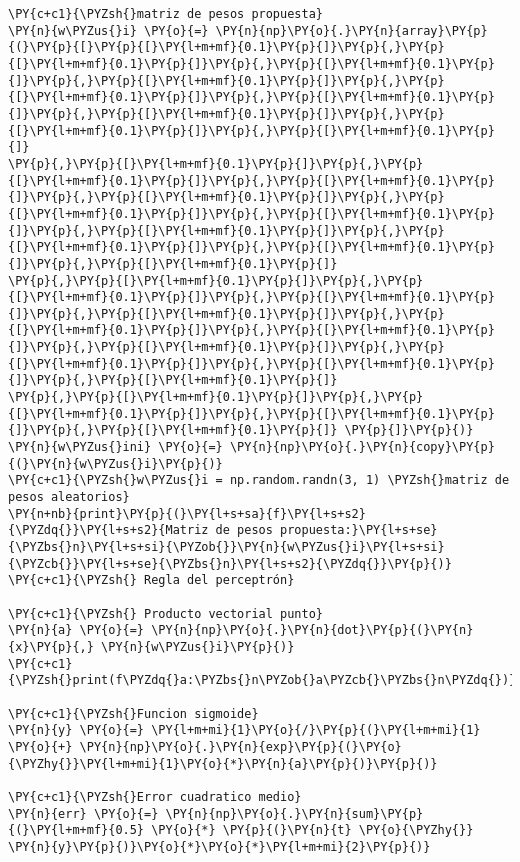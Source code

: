 \begin{tcolorbox}[breakable, size=fbox, boxrule=1pt, pad at break*=1mm,colback=cellbackground, colframe=cellborder]
\begin{Verbatim}[commandchars=\\\{\}]
\PY{c+c1}{\PYZsh{}matriz de pesos propuesta}
\PY{n}{w\PYZus{}i} \PY{o}{=} \PY{n}{np}\PY{o}{.}\PY{n}{array}\PY{p}{(}\PY{p}{[}\PY{p}{[}\PY{l+m+mf}{0.1}\PY{p}{]}\PY{p}{,}\PY{p}{[}\PY{l+m+mf}{0.1}\PY{p}{]}\PY{p}{,}\PY{p}{[}\PY{l+m+mf}{0.1}\PY{p}{]}\PY{p}{,}\PY{p}{[}\PY{l+m+mf}{0.1}\PY{p}{]}\PY{p}{,}\PY{p}{[}\PY{l+m+mf}{0.1}\PY{p}{]}\PY{p}{,}\PY{p}{[}\PY{l+m+mf}{0.1}\PY{p}{]}\PY{p}{,}\PY{p}{[}\PY{l+m+mf}{0.1}\PY{p}{]}\PY{p}{,}\PY{p}{[}\PY{l+m+mf}{0.1}\PY{p}{]}\PY{p}{,}\PY{p}{[}\PY{l+m+mf}{0.1}\PY{p}{]}
\PY{p}{,}\PY{p}{[}\PY{l+m+mf}{0.1}\PY{p}{]}\PY{p}{,}\PY{p}{[}\PY{l+m+mf}{0.1}\PY{p}{]}\PY{p}{,}\PY{p}{[}\PY{l+m+mf}{0.1}\PY{p}{]}\PY{p}{,}\PY{p}{[}\PY{l+m+mf}{0.1}\PY{p}{]}\PY{p}{,}\PY{p}{[}\PY{l+m+mf}{0.1}\PY{p}{]}\PY{p}{,}\PY{p}{[}\PY{l+m+mf}{0.1}\PY{p}{]}\PY{p}{,}\PY{p}{[}\PY{l+m+mf}{0.1}\PY{p}{]}\PY{p}{,}\PY{p}{[}\PY{l+m+mf}{0.1}\PY{p}{]}\PY{p}{,}\PY{p}{[}\PY{l+m+mf}{0.1}\PY{p}{]}\PY{p}{,}\PY{p}{[}\PY{l+m+mf}{0.1}\PY{p}{]}
\PY{p}{,}\PY{p}{[}\PY{l+m+mf}{0.1}\PY{p}{]}\PY{p}{,}\PY{p}{[}\PY{l+m+mf}{0.1}\PY{p}{]}\PY{p}{,}\PY{p}{[}\PY{l+m+mf}{0.1}\PY{p}{]}\PY{p}{,}\PY{p}{[}\PY{l+m+mf}{0.1}\PY{p}{]}\PY{p}{,}\PY{p}{[}\PY{l+m+mf}{0.1}\PY{p}{]}\PY{p}{,}\PY{p}{[}\PY{l+m+mf}{0.1}\PY{p}{]}\PY{p}{,}\PY{p}{[}\PY{l+m+mf}{0.1}\PY{p}{]}\PY{p}{,}\PY{p}{[}\PY{l+m+mf}{0.1}\PY{p}{]}\PY{p}{,}\PY{p}{[}\PY{l+m+mf}{0.1}\PY{p}{]}\PY{p}{,}\PY{p}{[}\PY{l+m+mf}{0.1}\PY{p}{]}
\PY{p}{,}\PY{p}{[}\PY{l+m+mf}{0.1}\PY{p}{]}\PY{p}{,}\PY{p}{[}\PY{l+m+mf}{0.1}\PY{p}{]}\PY{p}{,}\PY{p}{[}\PY{l+m+mf}{0.1}\PY{p}{]}\PY{p}{,}\PY{p}{[}\PY{l+m+mf}{0.1}\PY{p}{]} \PY{p}{]}\PY{p}{)}
\PY{n}{w\PYZus{}ini} \PY{o}{=} \PY{n}{np}\PY{o}{.}\PY{n}{copy}\PY{p}{(}\PY{n}{w\PYZus{}i}\PY{p}{)}
\PY{c+c1}{\PYZsh{}w\PYZus{}i = np.random.randn(3, 1) \PYZsh{}matriz de pesos aleatorios}
\PY{n+nb}{print}\PY{p}{(}\PY{l+s+sa}{f}\PY{l+s+s2}{\PYZdq{}}\PY{l+s+s2}{Matriz de pesos propuesta:}\PY{l+s+se}{\PYZbs{}n}\PY{l+s+si}{\PYZob{}}\PY{n}{w\PYZus{}i}\PY{l+s+si}{\PYZcb{}}\PY{l+s+se}{\PYZbs{}n}\PY{l+s+s2}{\PYZdq{}}\PY{p}{)}
\PY{c+c1}{\PYZsh{} Regla del perceptrón}

\PY{c+c1}{\PYZsh{} Producto vectorial punto}
\PY{n}{a} \PY{o}{=} \PY{n}{np}\PY{o}{.}\PY{n}{dot}\PY{p}{(}\PY{n}{x}\PY{p}{,} \PY{n}{w\PYZus{}i}\PY{p}{)}
\PY{c+c1}{\PYZsh{}print(f\PYZdq{}a:\PYZbs{}n\PYZob{}a\PYZcb{}\PYZbs{}n\PYZdq{})}

\PY{c+c1}{\PYZsh{}Funcion sigmoide}
\PY{n}{y} \PY{o}{=} \PY{l+m+mi}{1}\PY{o}{/}\PY{p}{(}\PY{l+m+mi}{1} \PY{o}{+} \PY{n}{np}\PY{o}{.}\PY{n}{exp}\PY{p}{(}\PY{o}{\PYZhy{}}\PY{l+m+mi}{1}\PY{o}{*}\PY{n}{a}\PY{p}{)}\PY{p}{)}

\PY{c+c1}{\PYZsh{}Error cuadratico medio}
\PY{n}{err} \PY{o}{=} \PY{n}{np}\PY{o}{.}\PY{n}{sum}\PY{p}{(}\PY{l+m+mf}{0.5} \PY{o}{*} \PY{p}{(}\PY{n}{t} \PY{o}{\PYZhy{}} \PY{n}{y}\PY{p}{)}\PY{o}{*}\PY{o}{*}\PY{l+m+mi}{2}\PY{p}{)}


\end{Verbatim}
\end{tcolorbox}
